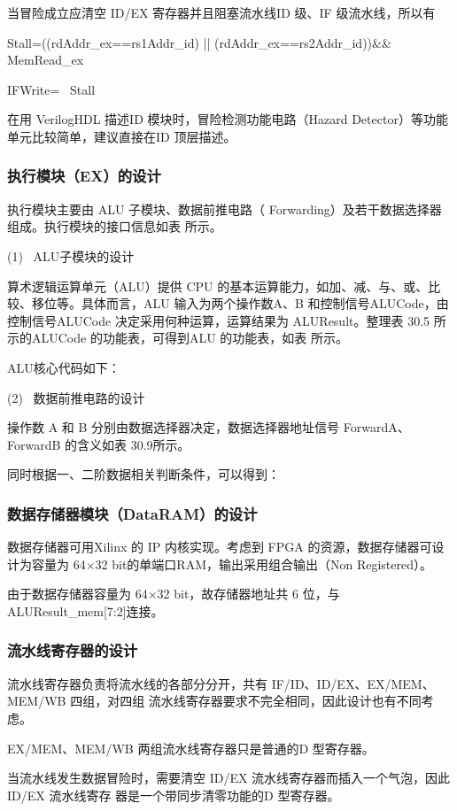 \documentclass{../source/Experiment}
\begin{document}
当冒险成立应清空 ID/EX 寄存器并且阻塞流水线ID 级、IF 级流水线，所以有

Stall=((rdAddr\_ex==rs1Addr\_id) || (rdAddr\_ex==rs2Addr\_id))\&\& MemRead\_ex

IFWrite= ~Stall

在用 VerilogHDL 描述ID 模块时，冒险检测功能电路（Hazard Detector）等功能单元比较简单，建议直接在ID 顶层描述。

\subsubsection{执行模块（EX）的设计}
执行模块主要由 ALU 子模块、数据前推电路（ Forwarding）及若干数据选择器组成。执行模块的接口信息如表  所示。

(1) \, ALU子模块的设计

算术逻辑运算单元（ALU）提供 CPU 的基本运算能力，如加、减、与、或、比较、移位等。具体而言，ALU 输入为两个操作数A、B 和控制信号ALUCode，由控制信号ALUCode 决定采用何种运算，运算结果为 ALUResult。整理表 30.5 所示的ALUCode 的功能表，可得到ALU 的功能表，如表 所示。

ALU核心代码如下：

(2) \, 数据前推电路的设计

操作数 A 和 B 分别由数据选择器决定，数据选择器地址信号 ForwardA、ForwardB 的含义如表 30.9所示。

同时根据一、二阶数据相关判断条件，可以得到：


\subsubsection{数据存储器模块（DataRAM）的设计}
数据存储器可用Xilinx 的 IP 内核实现。考虑到 FPGA 的资源，数据存储器可设计为容量为 64×32 bit的单端口RAM，输出采用组合输出（Non Registered）。

由于数据存储器容量为 64×32 bit，故存储器地址共 6 位，与ALUResult\_mem[7:2]连接。


\subsubsection{流水线寄存器的设计}
流水线寄存器负责将流水线的各部分分开，共有 IF/ID、ID/EX、EX/MEM、MEM/WB 四组，对四组
流水线寄存器要求不完全相同，因此设计也有不同考虑。

EX/MEM、MEM/WB 两组流水线寄存器只是普通的D 型寄存器。

当流水线发生数据冒险时，需要清空 ID/EX 流水线寄存器而插入一个气泡，因此 ID/EX 流水线寄存
器是一个带同步清零功能的D 型寄存器。
\end{document}
